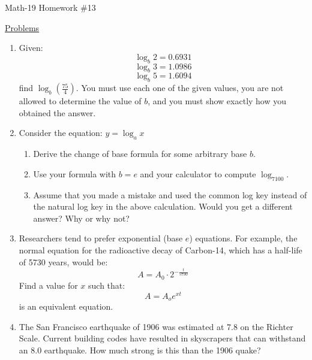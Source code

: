 \documentclass[letterpaper,12pt,fleqn]{article}
\begin{document}
\begin{center}
\Large Math-19 Homework \#13
\end{center}

\vspace{0.5in}

\underline{Problems}

\begin{enumerate}

\item Given:
  \[\log_b{2}=0.6931\]
  \[\log_b{3}=1.0986\]
  \[\log_b{5}=1.6094\]
  find $\log_b{\left(\frac{75}{4}\right)}$. You must use each one of the given
  values, you are not allowed to determine the value of $b$, and you must show
  exactly how you obtained the answer.

\item Consider the equation: $y=\log_a{x}$
\begin{enumerate}
\item Derive the change of base formula for some arbitrary base $b$.
\item Use your formula with $b=e$ and your calculator to compute $\log_7100$.
\item Assume that you made a mistake and used the common log key instead of the
natural log key in the above calculation. Would you get a different answer?
Why or why not?
\end{enumerate} 

\item Researchers tend to prefer exponential (base $e$) equations. For example,
the normal equation for the radioactive decay of Carbon-14, which has a
half-life of 5730 years, would be:
\[A=A_0\cdot2^{-\frac{t}{5730}}\]
Find a value for $x$ such that:
\[A=A_oe^{xt}\]
is an equivalent equation.

\item The San Francisco earthquake of 1906 was estimated at 7.8 on the Richter
Scale. Current building codes have resulted in skyscrapers that can withstand
an 8.0 earthquake. How much strong is this than the 1906 quake?
\end{enumerate}
 
\end{document}
